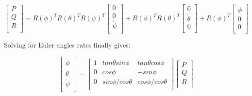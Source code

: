 \begin{equation}
\label{S11}
 \begin{bmatrix}
 	P \\
 	Q \\
 	R \\
 	\end{bmatrix}=R(\phi)^{T}R(\theta)^{T}R(\psi)^{T}\begin{bmatrix}
 	0  \\
 	0  \\
 	\dot{\psi}  \\
 	\end{bmatrix}+R(\phi)^{T}R(\theta)^{T}\begin{bmatrix}
 	0  \\
 	\dot{\theta}  \\
 	0  \\
 	\end{bmatrix}+R(\phi)^{T}\begin{bmatrix}
 	\dot{\phi}  \\
 	0  \\
 	0  \\
\end{bmatrix}
\end{equation}

Solving for Euler angles rates finally gives:

\begin{equation}
\label{S10}
 \begin{bmatrix}
 	\dot{\phi} \\
 	\dot{\theta} \\
 	\dot{\psi} \\
 	\end{bmatrix}=\begin{bmatrix}
 	1 & tan\theta sin\phi & tan\theta cos\phi \\
 	0 & cos\phi & -sin\phi  \\
 	0 & sin\phi / cos\theta & cos\phi / cos\theta  \\
 	\end{bmatrix}\begin{bmatrix}
 	P \\
 	Q \\
 	R \\
\end{bmatrix}
\end{equation}